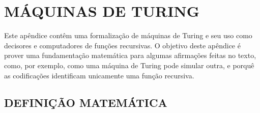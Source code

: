 \chapter{MÁQUINAS DE TURING}
\label{app:turing_machines}

\newcommand\B{\tikz{\draw (0, 0.5ex) -- (0, 0) -- (0.5em, 0) -- (0.5em, 0.5ex);}}

Este apêndice contêm uma formalização de máquinas de Turing
e seu uso como decisores e computadores de funções recursivas.
O objetivo deste apêndice é prover uma fundamentação matemática
para algumas afirmações feitas no texto,
como, por exemplo,
como uma máquina de Turing pode simular outra,
e porquê as codificações identificam unicamente uma função recursiva.

\section{DEFINIÇÃO MATEMÁTICA}

